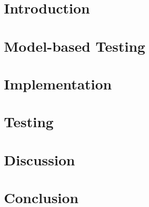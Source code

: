 \documentclass[a4paper, 12pt,titlepage]{dithesis}
\begin{document}
\setlongtables
\begin{longtable}[l]{p{3cm}p{}}



\end{longtable}
\setcounter{table}{0}

\chapter{Introduction}
\sivunumerot
\thispagestyle{empty}

\chapter{Model-based Testing}


\chapter{Implementation}

\chapter{Testing}

\chapter{Discussion}

\chapter{Conclusion}



\end{document}
